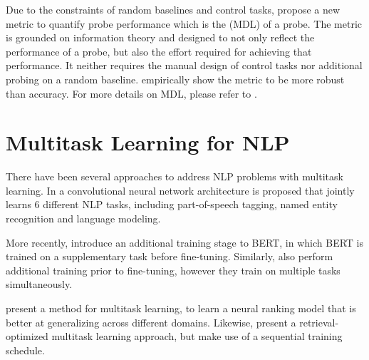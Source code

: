 Due to the constraints of random baselines and control tasks, \citep{voita-titov-2020-information} propose a new metric to quantify probe performance which is the  (MDL) of a probe. The metric is grounded on information theory \cite{shannon1948mathematical} and designed to not only reflect the performance of a probe, but also the effort required for achieving that performance. It neither requires the manual design of control tasks nor additional probing on a random baseline. \citep{voita-titov-2020-information} empirically show the metric to be more robust than accuracy. For more details on MDL, please refer to .

\section{Multitask Learning for NLP}
There have been several approaches to address NLP problems with multitask learning. In \citep{10.1145/1390156.1390177} a convolutional neural network architecture is proposed that jointly learns 6 different NLP tasks, including part-of-speech tagging, named entity recognition and language modeling.

More recently, \citep{DBLP:journals/corr/abs-1811-01088} introduce an additional training stage to BERT, in which BERT is trained on a supplementary task before fine-tuning. Similarly, \citep{DBLP:journals/corr/abs-1901-11504} also perform additional training prior to fine-tuning, however they train on multiple tasks simultaneously.

\citep{maillard-etal-2021-multi} present a method for multitask learning, to learn a neural ranking model that is better at generalizing across different domains. Likewise, \citep{Fun2021EfficientRO} present a retrieval-optimized multitask learning approach, but make use of a sequential training schedule.